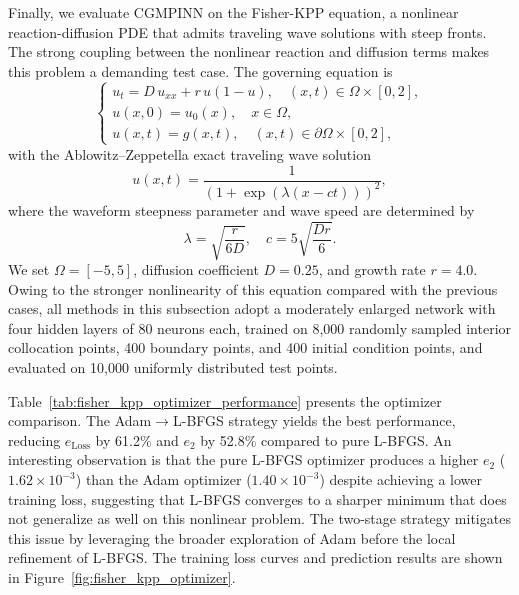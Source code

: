 \documentclass{article}
\theoremstyle{plain}
\theoremstyle{definition}
\theoremstyle{remark}
\begin{document}
Finally, we evaluate CGMPINN on the Fisher-KPP equation, a nonlinear reaction-diffusion PDE that admits traveling wave solutions with steep fronts. The strong coupling between the nonlinear reaction and diffusion terms makes this problem a demanding test case. The governing equation is
\begin{equation}
	\begin{cases}
		u_t = D\, u_{xx} + r\, u(1 - u), \quad (x,t) \in \Omega \times [0,2], \\
		u(x,0) = u_0(x), \quad x \in \Omega, \\
		u(x,t) = g(x,t), \quad (x,t) \in \partial\Omega \times [0,2],
	\end{cases}
	\label{eq:fisher_kpp}
\end{equation}
with the Ablowitz--Zeppetella exact traveling wave solution
\begin{equation}
	u(x,t) = \frac{1}{\left(1 + \exp\left(\lambda (x - ct)\right)\right)^2},
	\label{eq:fisher_kpp_solution}
\end{equation}
where the waveform steepness parameter and wave speed are determined by
\begin{equation}
	\lambda = \sqrt{\frac{r}{6D}}, \quad c = 5\sqrt{\frac{Dr}{6}}.
	\label{eq:fisher_kpp_parameters}
\end{equation}
We set $\Omega=[-5,5]$, diffusion coefficient $D = 0.25$, and growth rate $r = 4.0$. Owing to the stronger nonlinearity of this equation compared with the previous cases, all methods in this subsection adopt a moderately enlarged network with four hidden layers of 80 neurons each, trained on 8{,}000 randomly sampled interior collocation points, 400 boundary points, and 400 initial condition points, and evaluated on 10{,}000 uniformly distributed test points.

Table~\ref{tab:fisher_kpp_optimizer_performance} presents the optimizer comparison. The Adam$\to$L-BFGS strategy yields the best performance, reducing $e_{\text{Loss}}$ by 61.2\% and $e_2$ by 52.8\% compared to pure L-BFGS. An interesting observation is that the pure L-BFGS optimizer produces a higher $e_2$ ($1.62\times10^{-3}$) than the Adam optimizer ($1.40\times10^{-3}$) despite achieving a lower training loss, suggesting that L-BFGS converges to a sharper minimum that does not generalize as well on this nonlinear problem. The two-stage strategy mitigates this issue by leveraging the broader exploration of Adam before the local refinement of L-BFGS. The training loss curves and prediction results are shown in Figure~\ref{fig:fisher_kpp_optimizer}.
\end{document}
